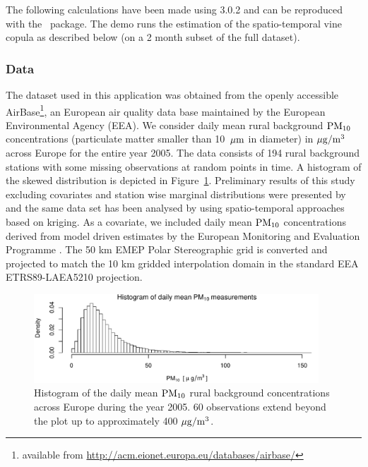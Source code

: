\documentclass[article,nojss]{jss}
\begin{document}
The following calculations have been made using  3.0.2 \citep{RCoreTeam2013} and can be reproduced with the  ~package. The demo  runs the estimation of the spatio-temporal vine copula as described below (on a 2 month subset of the full dataset). 

\subsubsection*{Data}
The dataset used in this application was obtained from the openly accessible AirBase\footnote{available from \url{http://acm.eionet.europa.eu/databases/airbase/}}, an European air quality data base maintained by the European Environmental Agency (EEA). We consider daily mean rural background $\rm{PM}_{10}$ concentrations (particulate matter smaller than 10~$\rm{\mu m}$ in diameter) in $\rm{\mu g/m^3}$ across Europe for the entire year 2005. The data consists of 194 rural background stations with some missing observations at random points in time. A histogram of the skewed distribution is depicted in Figure~\ref{fig:histPM10}. Preliminary results of this study excluding covariates and station wise marginal distributions were presented by \citet{Graler2012a} and the same data set has been analysed by \citet{Graler2012} using spatio-temporal approaches based on kriging. As a covariate, we included daily mean $\rm{PM}_{10}$ concentrations derived from model driven estimates by the European Monitoring and Evaluation Programme \citep{EMEP2005}. The 50 km EMEP Polar Stereographic grid is converted and projected to match the 10 km gridded interpolation domain in the standard EEA ETRS89-LAEA5210 projection. 

\begin{figure}[bt]
\center
\includegraphics[width=0.95\textwidth]{hist_PM10.pdf}
\caption{Histogram of the daily mean $\rm{PM}_{10}$ rural background concentrations across Europe during the year 2005. 60 observations extend beyond the plot up to approximately 400 $\rm{\mu g/m^3}$.\label{fig:histPM10}}
\end{figure}
\end{document}
